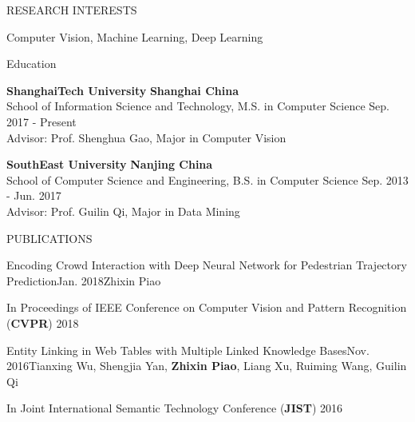\documentclass{resume} %
\begin{document}

\begin{rSection}{RESEARCH INTERESTS}

{Computer Vision, Machine Learning, Deep Learning}


\end{rSection}

\begin{rSection}{Education}

{\bf ShanghaiTech University} \hfill {\bf Shanghai China}
\\ 
School of Information Science and Technology, M.S. in Computer Science \hfill {Sep. 2017 - Present}
\\
Advisor: Prof. Shenghua Gao, Major in  Computer Vision

{\bf SouthEast University} \hfill {\bf Nanjing China}
\\ 
School of Computer Science and Engineering, B.S. in Computer Science \hfill {Sep. 2013 - Jun. 2017}
\\
Advisor: Prof. Guilin Qi, Major in Data Mining


\end{rSection}

\begin{rSection}{PUBLICATIONS}
    \begin{pubSubsection}{Encoding Crowd Interaction with Deep Neural Network for Pedestrian Trajectory Prediction}{Jan. 2018}{Zhixin Piao}{}
        \item In Proceedings of IEEE Conference on Computer Vision and Pattern Recognition (\textbf{CVPR}) 2018
    \end{pubSubsection} 
    
    \begin{pubSubsection}{Entity Linking in Web Tables with Multiple Linked Knowledge Bases}{Nov. 2016}{Tianxing Wu, Shengjia Yan, \textbf{Zhixin Piao}, Liang Xu, Ruiming Wang, Guilin Qi}{}
        \item In Joint International Semantic Technology Conference (\textbf{JIST}) 2016
    \end{pubSubsection} 
\end{rSection} 
\end{document}
